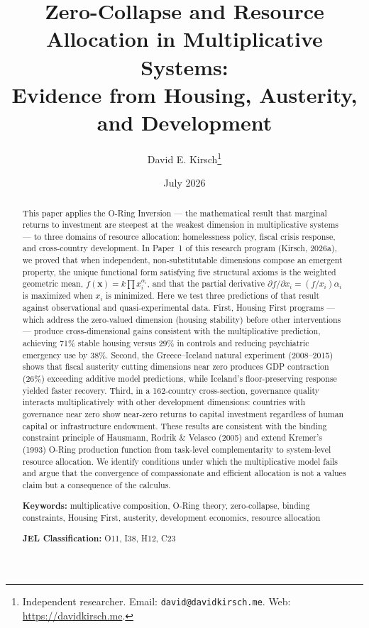 \documentclass[12pt]{article}
\title{Zero-Collapse and Resource Allocation in Multiplicative Systems: \\
Evidence from Housing, Austerity, and Development}
\author{David E. Kirsch\thanks{Independent researcher. Email: \texttt{david@davidkirsch.me}. Web: \url{https://davidkirsch.me}.}}
\date{July 2026}
\begin{document}
\maketitle

\begin{abstract}
\noindent This paper applies the O-Ring Inversion --- the mathematical result that marginal returns to investment are steepest at the weakest dimension in multiplicative systems --- to three domains of resource allocation: homelessness policy, fiscal crisis response, and cross-country development. In Paper~1 of this research program (Kirsch, 2026a), we proved that when independent, non-substitutable dimensions compose an emergent property, the unique functional form satisfying five structural axioms is the weighted geometric mean, $f(\mathbf{x}) = k\prod x_i^{\alpha_i}$, and that the partial derivative $\partial f/\partial x_i = (f/x_i)\alpha_i$ is maximized when $x_i$ is minimized. Here we test three predictions of that result against observational and quasi-experimental data. First, Housing First programs --- which address the zero-valued dimension (housing stability) before other interventions --- produce cross-dimensional gains consistent with the multiplicative prediction, achieving 71\% stable housing versus 29\% in controls and reducing psychiatric emergency use by 38\%. Second, the Greece--Iceland natural experiment (2008--2015) shows that fiscal austerity cutting dimensions near zero produces GDP contraction (26\%) exceeding additive model predictions, while Iceland's floor-preserving response yielded faster recovery. Third, in a 162-country cross-section, governance quality interacts multiplicatively with other development dimensions: countries with governance near zero show near-zero returns to capital investment regardless of human capital or infrastructure endowment. These results are consistent with the binding constraint principle of Hausmann, Rodrik \& Velasco (2005) and extend Kremer's (1993) O-Ring production function from task-level complementarity to system-level resource allocation. We identify conditions under which the multiplicative model fails and argue that the convergence of compassionate and efficient allocation is not a values claim but a consequence of the calculus.

\medskip
\noindent \textbf{Keywords:} multiplicative composition, O-Ring theory, zero-collapse, binding constraints, Housing First, austerity, development economics, resource allocation

\medskip
\noindent \textbf{JEL Classification:} O11, I38, H12, C23
\end{abstract}
\end{document}
